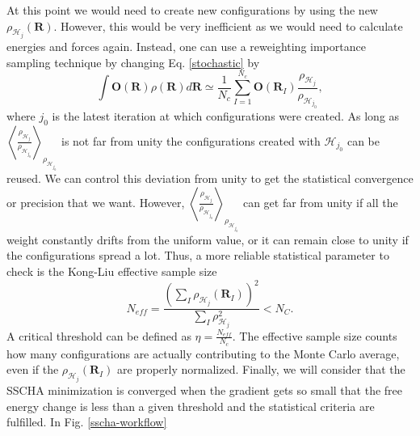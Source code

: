 At this point we would need to create new configurations by using the new $\rho_{\mathcal{H}_{j}}(\mathbf{R})$. However, this would be very inefficient as we would need to calculate energies and forces again. 
Instead, one can use a reweighting  importance sampling technique by changing Eq. \ref{stochastic} by
\begin{equation}
 \int{\mathbf{O}(\mathbf{R})\rho(\mathbf{R})d\mathbf{R}}\simeq\frac{1}{N_{c}}\sum_{I=1}^{N_{c}}\mathbf{O}(\mathbf{R}_{I})\frac{\rho_{\mathcal{H}_{j}}}{\rho_{\mathcal{H}_{j_{0}}}},
\end{equation} 
where $j_{0}$ is the latest iteration at which configurations were created. As long as $\left\langle\frac{\rho_{\mathcal{H}_{j}}}{\rho_{\mathcal{H}_{j_{0}}}}\right\rangle_{\rho_{\mathcal{H}_{j_{0}}}}$ is not 
far from unity the configurations created with $\mathcal{H}_{j_{0}}$ can be reused. We can control this deviation from unity to get the statistical convergence or precision that we 
want. However, $\left\langle\frac{\rho_{\mathcal{H}_{j}}}{\rho_{\mathcal{H}_{j_{0}}}}\right\rangle_{\rho_{\mathcal{H}_{j_{0}}}}$ can get far from unity if all the weight constantly drifts from the uniform value, or it can remain 
close to unity if the configurations spread a lot. Thus, a more reliable statistical parameter to check is the Kong-Liu effective sample size\cite{monacelli2018pressure}
\begin{equation}
 N_{eff}=\frac{\left(\sum_{I}\rho_{\mathcal{H}_{j}}(\mathbf{R}_{I})\right)^{2}}{\sum_{I}\rho_{\mathcal{H}_{j}}^{2}}<N_{C}.
\end{equation}
A critical threshold can be defined as $\eta=\frac{N_{eff}}{N_{c}}$.
The effective sample size counts how many configurations are actually contributing to the Monte Carlo average, even if the $\rho_{\mathcal{H}_{j}}(\mathbf{R}_{I})$ are properly normalized. Finally, we will consider that the SSCHA 
minimization is converged when the gradient gets so small that the free energy change is less than a given threshold and the statistical criteria are fulfilled. 
In Fig. \ref{sscha-workflow}
